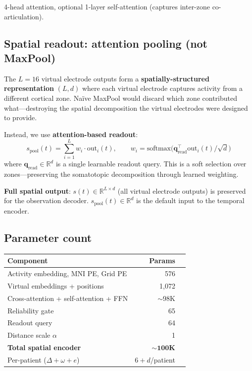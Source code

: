 \documentclass[11pt,letterpaper]{article}
\newcommand{\R}{\mathbb{R}}
\begin{document}
4-head attention, optional 1-layer self-attention (captures inter-zone co-articulation).

\subsection{Spatial readout: attention pooling (not MaxPool)}\label{sec:readout}

The $L = 16$ virtual electrode outputs form a \textbf{spatially-structured representation} $(L, d)$ where each virtual electrode captures activity from a different cortical zone. Na\"ive MaxPool would discard which zone contributed what---destroying the spatial decomposition the virtual electrodes were designed to provide.

Instead, we use \textbf{attention-based readout}:
\begin{equation}
s_{\text{pool}}(t) = \sum_{i=1}^{L} w_i \cdot \text{out}_i(t), \qquad w_i = \text{softmax}\bigl(\mathbf{q}_{\text{read}}^\top \text{out}_i(t) / \sqrt{d}\bigr)
\end{equation}
where $\mathbf{q}_{\text{read}} \in \R^d$ is a single learnable readout query. This is a soft selection over zones---preserving the somatotopic decomposition through learned weighting.

\textbf{Full spatial output}: $s(t) \in \R^{L \times d}$ (all virtual electrode outputs) is preserved for the observation decoder. $s_{\text{pool}}(t) \in \R^d$ is the default input to the temporal encoder.

\subsection{Parameter count}

\begin{table}[ht!]\centering\small
\begin{tabular}{@{}lrl@{}}
\toprule
\textbf{Component} & \textbf{Params} \\
\midrule
Activity embedding, MNI PE, Grid PE & 576 \\
Virtual embeddings + positions & 1,072 \\
Cross-attention + self-attention + FFN & ${\sim}$98K \\
Reliability gate & 65 \\
Readout query & 64 \\
Distance scale $\alpha$ & 1 \\
\midrule
\textbf{Total spatial encoder} & $\mathbf{{\sim}100}$\textbf{K} \\
Per-patient ($\Delta + \omega + e$) & $6 + d$/patient \\
\bottomrule
\end{tabular}
\end{table}
\end{document}
